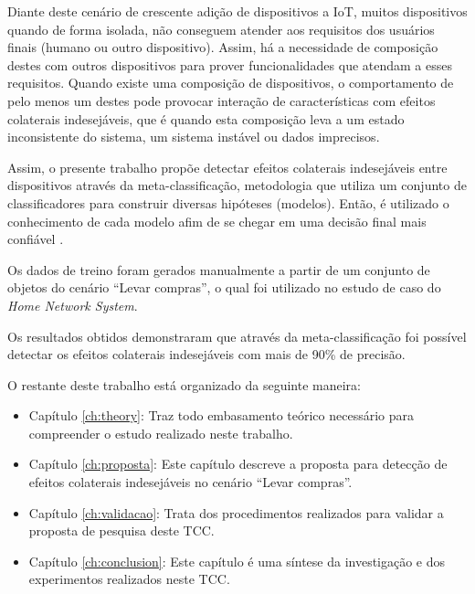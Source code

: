 Diante deste cenário de crescente adição de dispositivos a IoT, muitos dispositivos quando de forma isolada, não conseguem atender aos requisitos dos usuários finais (humano ou outro dispositivo). Assim, há a necessidade de composição destes com outros dispositivos para prover funcionalidades que atendam a esses requisitos. Quando existe uma composição de dispositivos, o comportamento de pelo menos um destes pode provocar interação de características com efeitos colaterais indesejáveis, que é quando esta composição leva a um estado inconsistente do sistema, um sistema instável ou dados imprecisos. 

Assim, o presente trabalho propõe detectar efeitos colaterais indesejáveis entre dispositivos através da meta-classificação, metodologia que utiliza um conjunto de classificadores para construir diversas hipóteses (modelos). Então, é utilizado o conhecimento de cada modelo afim de se chegar em uma decisão final mais confiável \cite{Melville:2004}.

Os dados de treino foram gerados manualmente a partir de um conjunto de objetos do cenário ``Levar compras'', o qual foi utilizado no estudo de caso do \textit{Home Network System}.

Os resultados obtidos demonstraram que através da meta-classificação foi possível detectar os efeitos colaterais indesejáveis com mais de 90\% de precisão.

O restante deste trabalho está organizado da seguinte maneira:

\begin{itemize}
\item Capítulo \ref{ch:theory}: Traz todo embasamento teórico necessário para compreender o estudo realizado neste trabalho.
\item Capítulo \ref{ch:proposta}: Este capítulo descreve a proposta para detecção de efeitos colaterais indesejáveis no cenário ``Levar compras''.
\item Capítulo \ref{ch:validacao}: Trata dos procedimentos realizados para validar a proposta de pesquisa deste TCC.
\item Capítulo \ref{ch:conclusion}: Este capítulo é uma síntese da investigação e dos experimentos realizados neste TCC.
\end{itemize}
